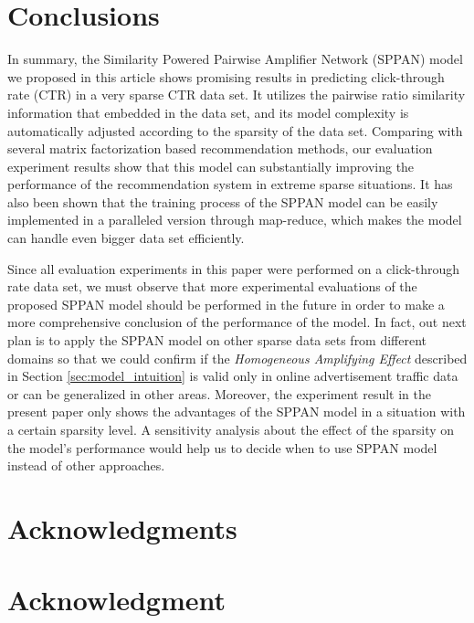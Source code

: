 \documentclass[conference,compsoc]{IEEEtran}
\begin{document}
\section{Conclusions}
\label{sec:conclusion}
In summary, the Similarity Powered Pairwise Amplifier Network (SPPAN) model we proposed in this article shows promising results in predicting click-through rate (CTR) in a very sparse CTR data set. It utilizes the pairwise ratio similarity information that embedded in the data set, and its model complexity is automatically adjusted according to the sparsity of the data set. Comparing with several matrix factorization based recommendation methods, our evaluation experiment results show that this model can substantially improving the performance of the recommendation system in extreme sparse situations. It has also been shown that the training process of the SPPAN model can be easily implemented in a paralleled version through map-reduce, which makes the model can handle even bigger data set efficiently.

Since all evaluation experiments in this paper were performed on a click-through rate data set, we must observe that more experimental evaluations of the proposed SPPAN model should be performed in the future in order to make a more comprehensive conclusion of the performance of the model. In fact, out next plan is to apply the SPPAN model on other sparse data sets from different domains so that we could confirm if the {\it Homogeneous Amplifying Effect} described in Section \ref{sec:model_intuition} is valid only in online advertisement traffic data or can be generalized in other areas. Moreover, the experiment result in the present paper only shows the advantages of the SPPAN model in a situation with a certain sparsity level. A
sensitivity analysis about the effect of the sparsity on the model's performance would help us to decide when  to use SPPAN model instead of other approaches.






\ifCLASSOPTIONcompsoc
  \section*{Acknowledgments}
\else
  \section*{Acknowledgment}
\fi
\end{document}
